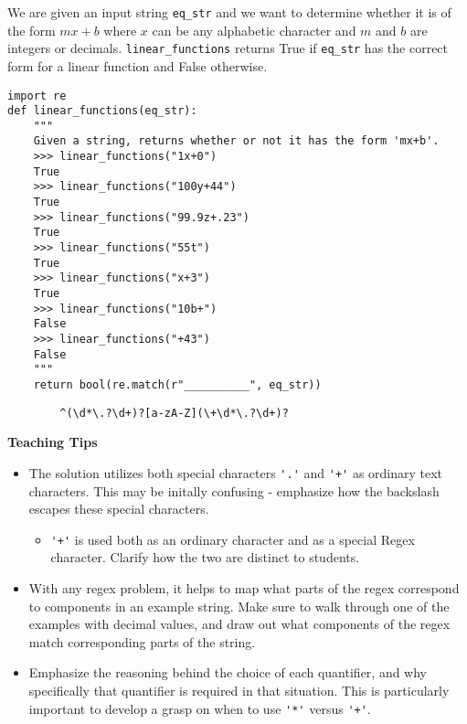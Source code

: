 \begin{blocksection}
\question We are given an input string \lstinline{eq_str} and we want to determine whether it is of the form 
$mx+b$ where $x$ can be any alphabetic character and $m$ and $b$ are integers or decimals. \lstinline{linear_functions} returns True if \lstinline{eq_str} 
has the correct form for a linear function and False otherwise.

\begin{lstlisting}
import re
def linear_functions(eq_str):
    """
    Given a string, returns whether or not it has the form 'mx+b'.
    >>> linear_functions("1x+0")
    True
    >>> linear_functions("100y+44")
    True
    >>> linear_functions("99.9z+.23")
    True
    >>> linear_functions("55t")
    True
    >>> linear_functions("x+3")
    True
    >>> linear_functions("10b+")
    False
    >>> linear_functions("+43")
    False
    """
    return bool(re.match(r"__________", eq_str))
\end{lstlisting}

\begin{solution}[2in]
    \begin{lstlisting}
        ^(\d*\.?\d+)?[a-zA-Z](\+\d*\.?\d+)?
    \end{lstlisting}
\end{solution}
\end{blocksection}

\begin{guide}
\begin{blocksection}
\textbf{Teaching Tips}
    \begin{itemize}
        \item The solution utilizes both special characters \lstinline$'.'$ and \lstinline$'+'$ as ordinary text characters. This may be initally confusing - emphasize how the backslash escapes these special characters.
        \begin{itemize}
            \item \lstinline$'+'$ is used both as an ordinary character and as a special Regex character. Clarify how the two are distinct to students.
        \end{itemize}
        \item With any regex problem, it helps to map what parts of the regex correspond to components in an example string. Make sure to walk through one of the examples with decimal values, and draw out what components of the regex match corresponding parts of the string.
        \item Emphasize the reasoning behind the choice of each quantifier, and why specifically that quantifier is required in that situation. This is particularly important to develop a grasp on when to use \lstinline$'*'$ versus \lstinline$'+'$.
    \end{itemize}
\end{blocksection}
\end{guide}
    